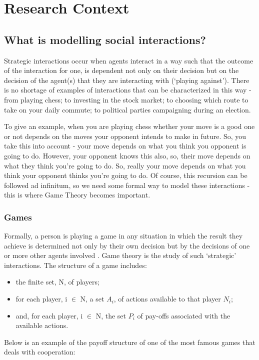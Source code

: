 \documentclass[12pt]{article}
\newcommand*{\np}{\par\noindent\newline}
\begin{document}
\section{Research Context}
\subsection{What is modelling social interactions?}
Strategic interactions occur when agents interact in a way such that the
outcome of the interaction for one, is dependent not  only on their decision
but on the decision of the agent(s) that they are interacting with
(`playing against'). There is no shortage of examples of interactions that can
be characterized in this way - from playing chess; to investing in the stock
market; to choosing which route to take on your daily commute; to political
parties campaigning during an election.
\np To give an example, when you are playing chess whether your move is a good
one or not depends on the moves your opponent intends to make in future. So,
you take this into account - your move depends on what you think you opponent
is going to do. However, your opponent knows this also, so, their move depends
on what they think you're going to do. So, really your move depends on what you
think your opponent thinks you're going to do. Of course, this recursion can be
followed ad infinitum, so we need some formal way to model these interactions -
this is where Game Theory becomes important.
\subsubsection{Games}
Formally, a person is playing a game in any situation in which the result they
achieve is determined not only by their own decision but by the decisions of
one or more other agents involved \cite{angner_course_2012}. Game theory is the
study of such `strategic' interactions.
The structure of a game includes:
\begin{itemize}
	\item the finite set, N, of players;
	\item for each player, i $\in$ N, a set $A_i$, of actions available to that
	player $N_i$;
	\item and, for each player, i $\in$ N, the set $P_i$ of pay-offs associated
	with the available actions.
\end{itemize}
\cite{osborne_course_1994}
\np Below is an example of the payoff structure of one of the most famous games
that deals with cooperation: 
\end{document}
